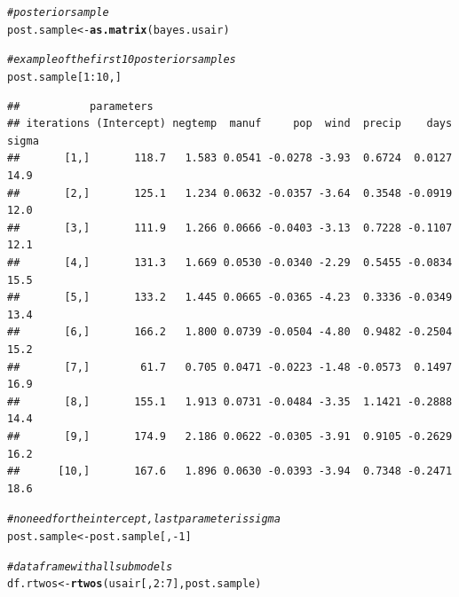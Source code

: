 \documentclass[11pt,a4paper,twoside]{book}\usepackage[]{graphicx}\usepackage[]{color}
\makeatletter
\newcommand{\hlnum}[1]{\textcolor[rgb]{0.686,0.059,0.569}{#1}}%
\newcommand{\hlcom}[1]{\textcolor[rgb]{0.678,0.584,0.686}{\textit{#1}}}%
\newcommand{\hlopt}[1]{\textcolor[rgb]{0,0,0}{#1}}%
\newcommand{\hlstd}[1]{\textcolor[rgb]{0.345,0.345,0.345}{#1}}%
\newcommand{\hlkwb}[1]{\textcolor[rgb]{0.69,0.353,0.396}{#1}}%
\newcommand{\hlkwd}[1]{\textcolor[rgb]{0.737,0.353,0.396}{\textbf{#1}}}%
\newenvironment{kframe}{%
 \def\at@end@of@kframe{}%
 \ifinner\ifhmode%
  \def\at@end@of@kframe{\end{minipage}}%
  \begin{minipage}{\columnwidth}%
 \fi\fi%
 \def\FrameCommand##1{\hskip\@totalleftmargin \hskip-\fboxsep
 \colorbox{shadecolor}{##1}\hskip-\fboxsep
     \hskip-\linewidth \hskip-\@totalleftmargin \hskip\columnwidth}%
 \MakeFramed {\advance\hsize-\width
   \@totalleftmargin\z@ \linewidth\hsize
   \@setminipage}}%
 {\par\unskip\endMakeFramed%
 \at@end@of@kframe}
\newenvironment{knitrout}{}{} %
\makeatother
\begin{document}
\begin{knitrout}
\begin{kframe}
\begin{alltt}
\hlcom{#posterior sample}
\hlstd{post.sample} \hlkwb{<-} \hlkwd{as.matrix}\hlstd{(bayes.usair)}

\hlcom{#example of the first 10 posterior samples}
\hlstd{post.sample[}\hlnum{1}\hlopt{:}\hlnum{10}\hlstd{,]}
\end{alltt}
\begin{verbatim}
##           parameters
## iterations (Intercept) negtemp  manuf     pop  wind  precip    days sigma
##       [1,]       118.7   1.583 0.0541 -0.0278 -3.93  0.6724  0.0127  14.9
##       [2,]       125.1   1.234 0.0632 -0.0357 -3.64  0.3548 -0.0919  12.0
##       [3,]       111.9   1.266 0.0666 -0.0403 -3.13  0.7228 -0.1107  12.1
##       [4,]       131.3   1.669 0.0530 -0.0340 -2.29  0.5455 -0.0834  15.5
##       [5,]       133.2   1.445 0.0665 -0.0365 -4.23  0.3336 -0.0349  13.4
##       [6,]       166.2   1.800 0.0739 -0.0504 -4.80  0.9482 -0.2504  15.2
##       [7,]        61.7   0.705 0.0471 -0.0223 -1.48 -0.0573  0.1497  16.9
##       [8,]       155.1   1.913 0.0731 -0.0484 -3.35  1.1421 -0.2888  14.4
##       [9,]       174.9   2.186 0.0622 -0.0305 -3.91  0.9105 -0.2629  16.2
##      [10,]       167.6   1.896 0.0630 -0.0393 -3.94  0.7348 -0.2471  18.6
\end{verbatim}
\begin{alltt}
\hlcom{#no need for the intercept, last parameter is sigma}
\hlstd{post.sample} \hlkwb{<-} \hlstd{post.sample[,}\hlopt{-}\hlnum{1}\hlstd{]}

\hlcom{#data frame with all submodels}
\hlstd{df.rtwos} \hlkwb{<-}\hlkwd{rtwos}\hlstd{(usair[,}\hlnum{2}\hlopt{:}\hlnum{7}\hlstd{], post.sample)}


\end{alltt}
\end{kframe}
\end{knitrout}
\end{document}
